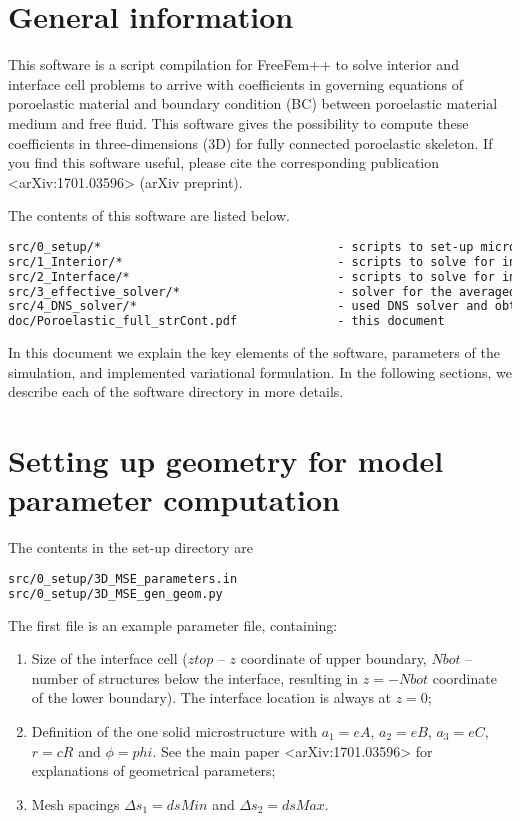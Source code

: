 \documentclass[12pt,a4paper]{article}
\begin{document}
\sloppy

\section{General information}

This software is a script compilation for FreeFem++ to solve interior and interface cell problems to arrive with coefficients in governing equations of poroelastic material and boundary condition (BC) between poroelastic material medium and free fluid. This software gives the possibility to compute these coefficients in three-dimensions (3D) for fully connected poroelastic skeleton. If you find this software useful, please cite the corresponding publication <arXiv:1701.03596> (arXiv preprint).

The contents of this software are listed below.
\begin{lstlisting}[language=tex]
src/0_setup/*                                 - scripts to set-up microscale geometry
src/1_Interior/*                              - scripts to solve for interior properties
src/2_Interface/*                             - scripts to solve for interface coefficients
src/3_effective_solver/*                      - solver for the averaged fields in the problem
src/4_DNS_solver/*                            - used DNS solver and obtained fields
doc/Poroelastic_full_strCont.pdf              - this document
\end{lstlisting}

In this document we explain the key elements of the software, parameters of the simulation, and implemented variational formulation. In the following sections, we describe each of the software directory in more details.

\section{Setting up geometry for model parameter computation} \label{sec:presim-start}

The contents in the set-up directory are
\begin{lstlisting}[language=tex]
src/0_setup/3D_MSE_parameters.in
src/0_setup/3D_MSE_gen_geom.py
\end{lstlisting}

The first file is an example parameter file, containing:
\begin{enumerate}
    \item Size of the interface cell ($ztop$ -- $z$ coordinate of upper boundary, $Nbot$ -- number of structures below the interface, resulting in $z = - Nbot$ coordinate of the lower boundary). The interface location is always at $z = 0$;
	\item Definition of the one solid microstructure with $a_1 = eA$, $a_2 = eB$, $a_3 = eC$, $r = cR$ and $\phi = phi$. See the main paper <arXiv:1701.03596> for explanations of geometrical parameters;
    \item Mesh spacings $\Delta s_1 = dsMin$ and $\Delta s_2 = dsMax$.
\end{enumerate}
\end{document}
